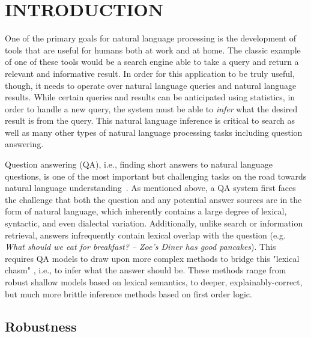 \chapter{INTRODUCTION\label{chapter:introduction}}

One of the primary goals for natural language processing is the development of tools that are useful for humans both at work and at home.  The classic example of one of these tools would be a search engine able to take a query and return a relevant and informative result.  In order for this application to be truly useful, though, it needs to operate over natural language queries and natural language results.  While certain queries and results can be anticipated using statistics, in order to handle a new query, the system must be able to \emph{infer} what the desired result is from the query.  This natural language inference is critical to search as well as many other types of natural language processing tasks including question answering.  

Question answering (QA), i.e., finding short answers to natural language questions, is one of the most important but challenging 
tasks on the road towards natural language understanding~\cite{Etzioni:11}. 
As mentioned above, a QA system first faces the challenge that both the question and any potential answer sources are in the form of natural language, which inherently contains a large degree of lexical, syntactic, and even dialectal variation.
Additionally, unlike search or information retrieval, answers infrequently contain lexical overlap with the question (e.g. {\em What should we eat for breakfast? -- Zoe's Diner has good pancakes}).  This requires QA models to draw upon more complex methods to bridge this "lexical chasm" \cite{Berger:00}, i.e., to infer what the answer should be.  These methods range from robust shallow models based on lexical semantics, to deeper, explainably-correct, but much more brittle inference methods based on first order logic.  


\section{Robustness}
\label{sec:robustness}


